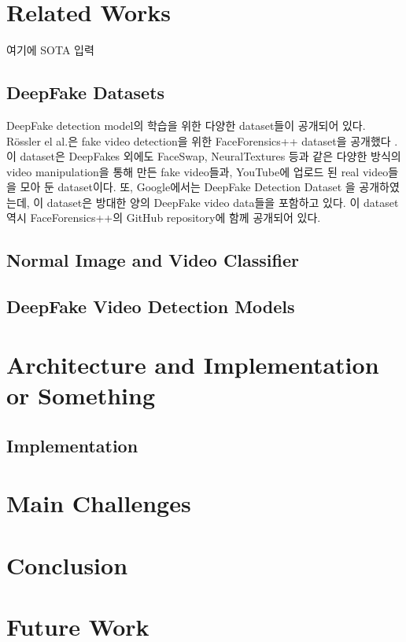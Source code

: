 \documentclass{article}
\begin{document}
	\section{Related Works}
	
	여기에 SOTA 입력
	
		\subsection{DeepFake Datasets}
		DeepFake detection model의 학습을 위한 다양한 dataset들이 공개되어 있다. R\"ossler el al.은 fake video detection을 위한 FaceForensics++ dataset을 공개했다 \cite{roessler2019faceforensicspp}. 이 dataset은 DeepFakes 외에도 FaceSwap, NeuralTextures 등과 같은 다양한 방식의 video manipulation을 통해 만든 fake video들과, YouTube에 업로드 된 real video들을 모아 둔 dataset이다. 또, Google에서는 DeepFake Detection Dataset \cite{DDD_GoogleJigSaw2019} 을 공개하였는데, 이 dataset은 방대한 양의 DeepFake video data들을 포함하고 있다. 이 dataset 역시 FaceForensics++의 GitHub 
		repository에 함께 공개되어 있다.
		
		\subsection{Normal Image and Video Classifier}
		
		\subsection{DeepFake Video Detection Models}
	
	\section{Architecture and Implementation or Something}
	
	\subsection{Implementation}
	
	
	
	\section{Main Challenges}
	
	
	\section{Conclusion}
	
	\section{Future Work}
	
	
	
	
	
	
	
\end{document}
